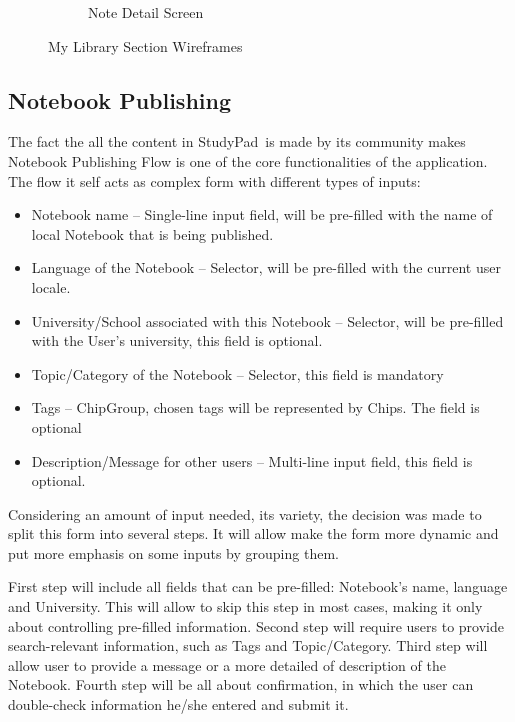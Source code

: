 \documentclass[thesis=B,english]{FITthesis}[2012/10/20]
\newcommand{\appname}{StudyPad}
\begin{document}
\begin{figure}
\begin{subfigure}{.5\textwidth}
  \caption{Note Detail Screen}
  \label{fig:detail}
\end{subfigure}

\caption{My Library Section Wireframes}
\label{fig:section-library}
\end{figure}

\newpage
\subsection{Notebook Publishing}
The fact the all the content in \appname\ is made by its community makes Notebook Publishing Flow is one of the core functionalities of the application. The flow it self acts as complex form with different types of inputs:
\begin{itemize}
	\item Notebook name -- Single-line input field, will be pre-filled with the name of local Notebook that is being published.
	\item Language of the Notebook -- Selector, will be pre-filled with the current user locale.
	\item University/School associated with this Notebook -- Selector, will be pre-filled with the User's university, this field is optional.
	\item Topic/Category of the Notebook -- Selector, this field is mandatory
	\item Tags -- ChipGroup, chosen tags will be represented by Chips. The field is optional
	\item Description/Message for other users -- Multi-line input field, this field is optional.
\end{itemize}



Considering an amount of input needed, its variety, the decision was made to split this form into several steps. It will allow make the form more dynamic and put more emphasis on some inputs by grouping them.

First step will include all fields that can be pre-filled: Notebook's name, language and University. This will allow to skip this step in most cases, making it only about controlling pre-filled information.
Second step will require users to provide search-relevant information, such as Tags and Topic/Category. Third step will allow user to provide a message or a more detailed of description of the Notebook. Fourth step will be all about confirmation, in which the user can double-check information he/she entered and submit it.
\end{document}
